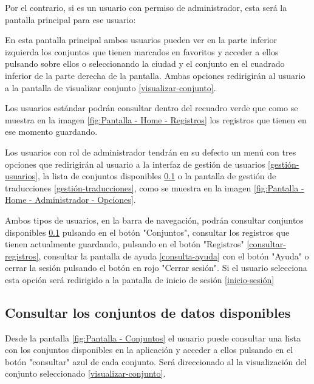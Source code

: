 Por el contrario, si es un usuario con permiso de administrador, esta será la pantalla principal para ese usuario:

En esta pantalla principal ambos usuarios pueden ver en la parte inferior izquierda los conjuntos que tienen marcados en favoritos y acceder a ellos pulsando sobre ellos o seleccionando la ciudad y el conjunto en el cuadrado inferior de la parte derecha de la pantalla. Ambas opciones redirigirán al usuario a la pantalla de visualizar conjunto \ref{visualizar-conjunto}.

Los usuarios estándar podrán consultar dentro del recuadro verde que como se muestra en la imagen \ref{fig:Pantalla - Home - Registros} los registros que tienen en ese momento guardando.

Los usuarios con rol de administrador tendrán en su defecto un menú con tres opciones que redirigirán al usuario a la interfaz de gestión de usuarios \ref{gestión-usuarios}, la lista de conjuntos disponibles \ref{consultar-conjuntos} o la pantalla de gestión de traducciones \ref{gestión-traducciones}, como se muestra en la imagen \ref{fig:Pantalla - Home - Administrador - Opciones}.

Ambos tipos de usuarios, en la barra de navegación, podrán consultar conjuntos disponibles \ref{consultar-conjuntos} pulsando en el botón "Conjuntos", consultar los registros que tienen actualmente guardando, pulsando en el botón "Registros" \ref{consultar-registros}, consultar la pantalla de ayuda \ref{consulta-ayuda} con el botón "Ayuda" o cerrar la sesión pulsando el botón en rojo "Cerrar sesión". Si el usuario selecciona esta opción será redirigido a la pantalla de inicio de sesión \ref{inicio-sesión}

\subsection{Consultar los conjuntos de datos disponibles}\label{consultar-conjuntos}
Desde la pantalla \ref{fig:Pantalla - Conjuntos} el usuario puede consultar una lista con los conjuntos disponibles en la aplicación y acceder a ellos pulsando en el botón "consultar" azul de cada conjunto. Será direccionado al la visualización del conjunto seleccionado \ref{visualizar-conjunto}.

